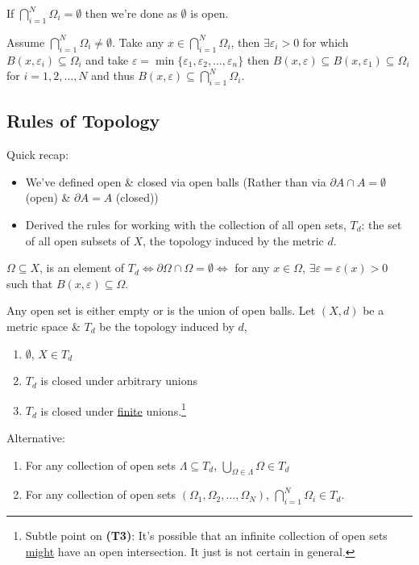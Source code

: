 \documentclass[10pt]{article}
\begin{document}
If $\bigcap_{i=1}^{N}\Omega_{i}=\emptyset$ then we're done as $\emptyset$ is open.

Assume $\bigcap_{i=1}^{N}\Omega_{i}\neq\emptyset$. Take any $x\in\bigcap_{i=1}^{N}\Omega_{i}$, then $\exists\varepsilon_{i}>0$ for which $B(x,\varepsilon_{i})\subseteq\Omega_{i}$ and take $\varepsilon=\min\{\varepsilon_{1}, \varepsilon_{2},\dots,\varepsilon_{n}\}$ then $B(x,\varepsilon)\subseteq B(x,\varepsilon_{1})\subseteq\Omega_{i}$ for $i=1,2,\dots,N$ and thus $B(x,\varepsilon)\subseteq\bigcap_{i=1}^{N}\Omega_{i}$.

\subsection{Rules of Topology}
Quick recap:
\begin{multicols}{2}
    \begin{itemize}
    \item We've defined open \& closed via open balls (Rather than via $\partial A\cap A=\emptyset$ (open) \& $\partial A=A$ (closed))
    \item Derived the rules for working with the collection of all open sets, $T_{d}$: the set of all open subsets of $X$, the topology induced by the metric $d$.
\end{itemize}
\end{multicols}

$\Omega\subseteq X$, is an element of $T_{d}\iff\partial\Omega\cap\Omega=\emptyset\iff$ for any $x\in\Omega$, $\exists\varepsilon=\varepsilon(x)>0$ such that $B(x,\varepsilon)\subseteq\Omega$.

Any open set is either empty or is the union of open balls. Let $(X,d)$ be a metric space \& $T_{d}$ be the topology induced by $d$,
\begin{enumerate}[label=\textbf{T\arabic*)}]
    \item $\emptyset$, $X\in T_{d}$ 
    \item $T_{d}$ is closed under arbitrary unions
    \item $T_{d}$ is closed under \underline{finite} unions.\footnote{Subtle point on \textbf{(T3)}: It's possible that an infinite collection of open sets \underline{might} have an open intersection. It just is not certain in general.}
\end{enumerate}

Alternative:
\begin{enumerate}[start=2, resume*]
    \item For any collection of open sets $\Lambda\subseteq T_{d}$, $\bigcup_{\Omega\in\Lambda}\Omega\in T_{d}$
    \item For any  collection of open sets $(\Omega_{1}, \Omega_{2}, \dots, \Omega_{N})$, $\bigcap_{i=1}^{N}\Omega_{i}\in T_{d}$.
\end{enumerate}
\end{document}
